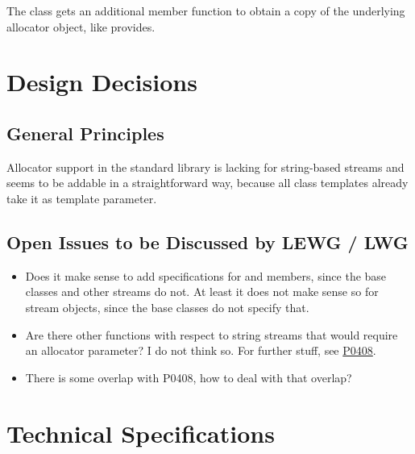 \documentclass[ebook,11pt,article]{memoir}
\begin{document}
The class  gets an additional member function to obtain a copy of the underlying allocator object, like  provides.

\chapter{Design Decisions}
\section{General Principles}
Allocator support in the standard library is lacking for string-based streams and seems to be addable in a straightforward way, because all class templates already take it as template parameter.
\section{Open Issues to be Discussed by LEWG / LWG}
\begin{itemize}
\item Does it make sense to add  specifications for  and  members, since the base classes and other streams do not. At least it does not make sense so for stream objects, since the base classes do not specify that.
\item Are there other functions with respect to string streams that would require an allocator parameter? I do not think so. For further stuff, see  \href{https://wg21.link/P0408}{P0408}.
\item There is some overlap with P0408, how to deal with that overlap?
\end{itemize}

\chapter{Technical Specifications}
\end{document}
